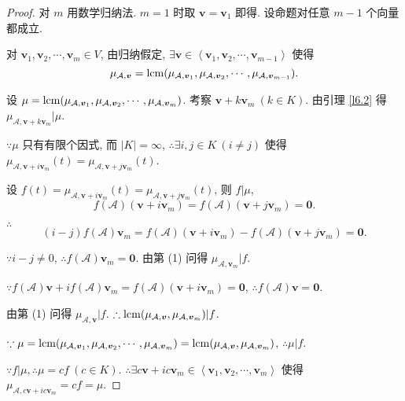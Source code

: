 \documentclass[color=black,device=normal,lang=cn,mode=geye]{elegantnote}
\begin{document}
\begin{proof}
    对 $m$ 用数学归纳法. $m=1$ 时取 $\boldsymbol{v}=\boldsymbol{v}_1$ 即得. 设命题对任意 $m-1$ 个向量都成立.

    对 $\boldsymbol{v}_1,\boldsymbol{v}_2,\cdots,\boldsymbol{v}_m\in V$, 由归纳假定, $\exists\boldsymbol{v}\in\left<\boldsymbol{v}_1,\boldsymbol{v}_2,\cdots,\boldsymbol{v}_{m-1}\right>$ 使得
    \[\mu_{\mathcal{A},\boldsymbol{v}}=\operatorname{lcm}(\mu_{\mathcal{A},\boldsymbol{v}_1},\mu_{\mathcal{A},\boldsymbol{v}_2},\cdots,\mu_{\mathcal{A},\boldsymbol{v}_{m-1}}).\]
    
    设 $\mu=\operatorname{lcm}(\mu_{\mathcal{A},\boldsymbol{v}_1},\mu_{\mathcal{A},\boldsymbol{v}_2},\cdots,\mu_{\mathcal{A},\boldsymbol{v}_m})$. 考察 $\boldsymbol{v}+k\boldsymbol{v}_m\ (k\in K)$. 由引理 \ref{l6.2} 得 $\mu_{\mathcal{A},\boldsymbol{v}+k\boldsymbol{v}_m}|\mu$.

    $\because\mu$ 只有有限个因式, 而 $|K|=\infty$, $\therefore\exists i,j\in K\ (i\neq j)$ 使得 $\mu_{\mathcal{A},\boldsymbol{v}+i\boldsymbol{v}_m}(t)=\mu_{\mathcal{A},\boldsymbol{v}+j\boldsymbol{v}_m}(t)$.

    设 $f(t)=\mu_{\mathcal{A},\boldsymbol{v}+i\boldsymbol{v}_m}(t)=\mu_{\mathcal{A},\boldsymbol{v}+j\boldsymbol{v}_m}(t)$, 则 $f|\mu$,
    \[f(\mathcal{A})(\boldsymbol{v}+i\boldsymbol{v}_m)=f(\mathcal{A})(\boldsymbol{v}+j\boldsymbol{v}_m)=\boldsymbol{0}.\]

    $\therefore$
    \[(i-j)f(\mathcal{A})\boldsymbol{v}_m=f(\mathcal{A})(\boldsymbol{v}+i\boldsymbol{v}_m)-f(\mathcal{A})(\boldsymbol{v}+j\boldsymbol{v}_m)=\boldsymbol{0}.\]

    $\because i-j\neq0$, $\therefore f(\mathcal{A})\boldsymbol{v}_m=\boldsymbol{0}$. 由第 (1) 问得 $\mu_{\mathcal{A},\boldsymbol{v}_m}|f$.
    
    $\because f(\mathcal{A})\boldsymbol{v}+if(\mathcal{A})\boldsymbol{v}_m=f(\mathcal{A})(\boldsymbol{v}+i\boldsymbol{v}_m)=\boldsymbol{0}$, $\therefore f(\mathcal{A})\boldsymbol{v}=\boldsymbol{0}$.
    
    由第 (1) 问得 $\mu_{\mathcal{A},\boldsymbol{v}}|f$. $\therefore\operatorname{lcm}(\mu_{\mathcal{A},\boldsymbol{v}},\mu_{\mathcal{A},\boldsymbol{v}_m})|f$.

    $\because\mu=\operatorname{lcm}(\mu_{\mathcal{A},\boldsymbol{v}_1},\mu_{\mathcal{A},\boldsymbol{v}_2},\cdots,\mu_{\mathcal{A},\boldsymbol{v}_m})=\operatorname{lcm}(\mu_{\mathcal{A},\boldsymbol{v}},\mu_{\mathcal{A},\boldsymbol{v}_m})$, $\therefore\mu|f$.
    
    $\because f|\mu,\therefore\mu=cf\ (c\in K)$. $\therefore\exists c\boldsymbol{v}+ic\boldsymbol{v}_m\in\left<\boldsymbol{v}_1,\boldsymbol{v}_2,\cdots,\boldsymbol{v}_m\right>$ 使得 $\mu_{\mathcal{A},c\boldsymbol{v}+ic\boldsymbol{v}_m}=cf=\mu$.
\end{proof}
\end{document}
